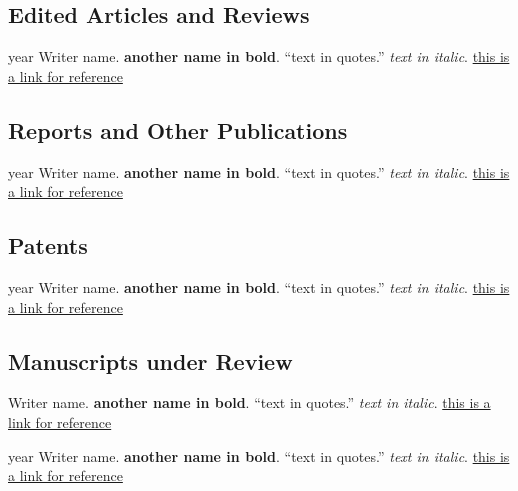 \documentclass[12pt,letterpaper]{report}
\begin{document}
    \subsection*{Edited Articles and Reviews}

    \begin{tablist}

        \item[year] \tab{}Writer name. \textbf{another name in bold}. \enquote{text in quotes.} \textit{text in italic}. \href{https://this.is.a.link}{this is a link for reference}

    \end{tablist}



    \subsection*{Reports and Other Publications}

    \begin{tablist}

        \item[year] \tab{}Writer name. \textbf{another name in bold}. \enquote{text in quotes.} \textit{text in italic}. \href{https://this.is.a.link}{this is a link for reference}

    \end{tablist}



    \subsection*{Patents}

    \begin{tablist}

        \item[year] \tab{}Writer name. \textbf{another name in bold}. \enquote{text in quotes.} \textit{text in italic}. \href{https://this.is.a.link}{this is a link for reference}

    \end{tablist}



    \subsection*{Manuscripts under Review}

    \begin{tablist}

        \item[\the\year] \tab{}Writer name. \textbf{another name in bold}. \enquote{text in quotes.} \textit{text in italic}. \href{https://this.is.a.link}{this is a link for reference}
    
        \item[year] \tab{}Writer name. \textbf{another name in bold}. \enquote{text in quotes.} \textit{text in italic}. \href{https://this.is.a.link}{this is a link for reference}

    \end{tablist}
\end{document}
